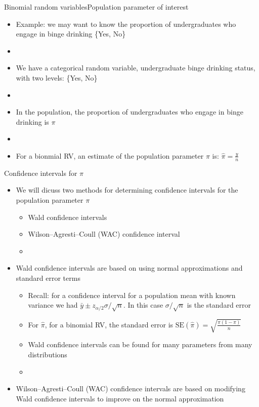 \documentclass[xcolor=dvipsnames]{beamer}
\begin{document}
\begin{frame}{Binomial random variables}{Population parameter of interest}
	\begin{itemize}
		\item Example: we may want to know the proportion of undergraduates who engage in binge drinking \{Yes, No\}
		\item[]
		\item We have a categorical random variable, undergraduate binge drinking status, with two levels: \{Yes, No\} 
		\item[]
		\item In the population, the proportion of undergraduates who engage in binge drinking is $\pi$
		\item[]
		\item For a bionmial RV, an estimate of the population parameter $\pi$ is: $\hat{\pi} = \frac{y}{n}$
	\end{itemize}
\end{frame}

\begin{frame}{Confidence intervals for $\pi$}
	\begin{itemize}
		\item We will dicuss two methods for determining confidence intervals for the population parameter $\pi$
		\begin{itemize}
			\item Wald confidence intervals
			\item Wilson–Agresti–Coull (WAC) confidence interval
			\item[]
		\end{itemize}
		
		\item Wald confidence intervals are based on using normal approximations and standard error terms
		\begin{itemize}
			\item Recall: for a confidence interval for a population mean with known variance we had $\bar{y} \pm z_{\alpha / 2} \sigma / \sqrt{n}$. In this case $\sigma / \sqrt{n}$ is the standard error
			\item For $\hat{\pi}$, for a binomial RV, the standard error is $\text{SE}(\hat{\pi}) = \sqrt{\frac{\pi(1-\pi)}{n}}$
			\item Wald confidence intervals can be found for many parameters from many distributions
			\item[]
		\end{itemize}
	
		\item Wilson–Agresti–Coull (WAC) confidence intervals are based on modifying Wald confidence intervals to improve on the normal approximation
	\end{itemize}
\end{frame}
\end{document}
